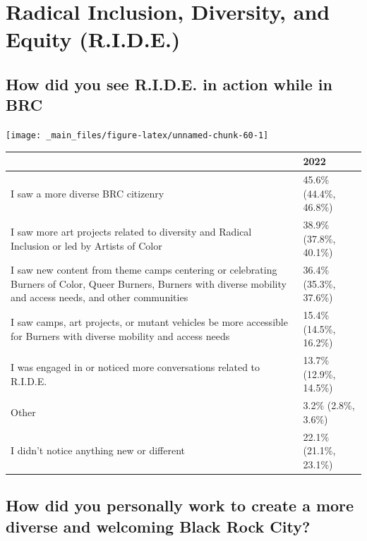 \documentclass[
]{book}
\begin{document}
\hypertarget{radical-inclusion-diversity-and-equity-r.i.d.e.}{%
\section{Radical Inclusion, Diversity, and Equity (R.I.D.E.)}\label{radical-inclusion-diversity-and-equity-r.i.d.e.}}

\hypertarget{how-did-you-see-r.i.d.e.-in-action-while-in-brc}{%
\subsection{How did you see R.I.D.E. in action while in BRC}\label{how-did-you-see-r.i.d.e.-in-action-while-in-brc}}

\texttt{[image: \_main\_files/figure-latex/unnamed-chunk-60-1]}

\begin{table}
\centering
\begin{tabular}[t]{>{}l|>{}l}
\hline
  & 2022\\
\hline
I saw a more diverse BRC citizenry & 45.6\% (44.4\%, 46.8\%)\\
\hline
I saw more art projects related to 
 diversity and Radical Inclusion or 
 led by Artists of Color & 38.9\% (37.8\%, 40.1\%)\\
\hline
I saw new content from theme camps 
 centering or celebrating Burners of Color, 
 Queer Burners, Burners with diverse mobility and 
 access needs, and other communities & 36.4\% (35.3\%, 37.6\%)\\
\hline
I saw camps, art projects, or mutant vehicles 
 be more accessible for Burners with  
 diverse mobility and access needs & 15.4\% (14.5\%, 16.2\%)\\
\hline
I was engaged in or noticed more 
 conversations related to R.I.D.E. & 13.7\% (12.9\%, 14.5\%)\\
\hline
Other & 3.2\% (2.8\%, 3.6\%)\\
\hline
I didn't notice anything new or different & 22.1\% (21.1\%, 23.1\%)\\
\hline
\end{tabular}
\end{table}

\hypertarget{how-did-you-personally-work-to-create-a-more-diverse-and-welcoming-black-rock-city}{%
\subsection{How did you personally work to create a more diverse and welcoming Black Rock City?}\label{how-did-you-personally-work-to-create-a-more-diverse-and-welcoming-black-rock-city}}
\end{document}
